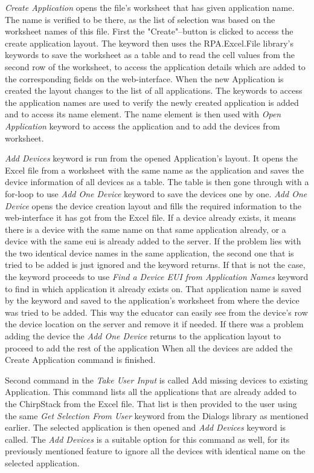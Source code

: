\clearpage

\textit{Create Application} opens the  file's worksheet that has given application name.
The name is verified to be there, as the list of selection was based on the worksheet names of this file.
First the "Create"--button is clicked to access the create application layout.
The keyword then uses the RPA.Excel.File library's keywords to save the worksheet as a table and to read the cell values from the second row of the worksheet, to access the application details which are added to the corresponding fields on the web-interface.
When the new Application is created the layout changes to the list of all applications.
The keywords to access the application names are used to verify the newly created application is added and to access its name element.
The name element is then used with \textit{Open Application} keyword to access the application and to add the devices from worksheet.

\textit{Add Devices} keyword is run from the opened Application's layout.
It opens the Excel file from a worksheet with the same name as the application and saves the device information of all devices as a table.
The table is then gone through with a for-loop to use \textit{Add One Device} keyword to save the devices one by one.
\textit{Add One Device} opens the device creation layout and fills the required information to the web-interface it has got from the Excel file.
If a device already exists, it means there is a device with the same name on that same application already, or a device with the same \gls{eui} is already added to the server.
If the problem lies with the two identical device names in the same application, the second one that is tried to be added is just ignored and the keyword returns.
If that is not the case, the keyword proceeds to use \textit{Find a Device EUI from Application Names} keyword to find in which application it already exists on.
That application name is saved by the keyword and saved to the application's worksheet from where the device was tried to be added.
This way the educator can easily see from the device's row the device location on the server and remove it if needed.
If there was a problem adding the device the \textit{Add One Device} returns to the application layout to proceed to add the rest of the application
When all the devices are added the Create Application command is finished.

Second command in the \textit{Take User Input} is called Add missing devices to existing Application.
This command lists all the applications that are already added to the ChirpStack from the Excel file.
That list is then provided to the user using the same \textit{Get Selection From User} keyword from the Dialogs library \cite{robotFramework:dialogsLibrary} as mentioned earlier.
The selected application is then opened and \textit{Add Devices} keyword is called.
The \textit{Add Devices} is a suitable option for this command as well, for its previously mentioned feature to ignore all the devices with identical name on the selected application.

